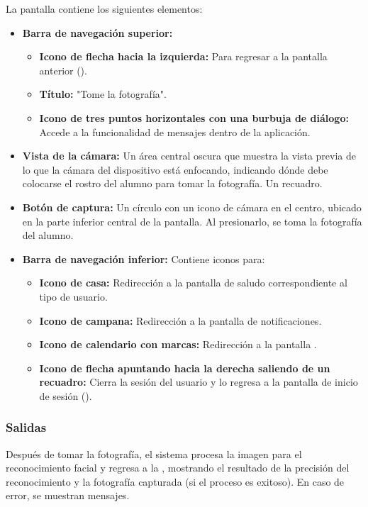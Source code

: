 La pantalla contiene los siguientes elementos:
\begin{itemize}
	\item \textbf{Barra de navegación superior:}
	\begin{itemize}
		\item \textbf{Icono de flecha hacia la izquierda:} Para regresar a la pantalla anterior ().
		\item \textbf{Título:} "Tome la fotografía".
		\item \textbf{Icono de tres puntos horizontales con una burbuja de diálogo:} Accede a la funcionalidad de mensajes dentro de la aplicación.
	\end{itemize}
	\item \textbf{Vista de la cámara:} Un área central oscura que muestra la vista previa de lo que la cámara del dispositivo está enfocando, indicando dónde debe colocarse el rostro del alumno para tomar la fotografía. Un recuadro.
	\item \textbf{Botón de captura:} Un círculo con un icono de cámara en el centro, ubicado en la parte inferior central de la pantalla. Al presionarlo, se toma la fotografía del alumno.
	\item \textbf{Barra de navegación inferior:} Contiene iconos para:
	\begin{itemize}
		\item \textbf{Icono de casa:} Redirección a la pantalla de saludo correspondiente al tipo de usuario.
		\item \textbf{Icono de campana:} Redirección a la pantalla de notificaciones.
		\item \textbf{Icono de calendario con marcas:} Redirección a la pantalla .
		\item \textbf{Icono de flecha apuntando hacia la derecha saliendo de un recuadro:} Cierra la sesión del usuario y lo regresa a la pantalla de inicio de sesión ().
	\end{itemize}
\end{itemize}

\subsubsection{Salidas}
Después de tomar la fotografía, el sistema procesa la imagen para el reconocimiento facial y regresa a la , mostrando el resultado de la precisión del reconocimiento y la fotografía capturada (si el proceso es exitoso). En caso de error, se muestran mensajes.

